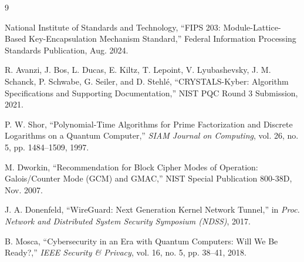 \documentclass[conference,onecolumn]{IEEEtran}
\begin{document}
\begin{thebibliography}{9}

National Institute of Standards and Technology, ``FIPS 203: Module-Lattice-Based Key-Encapsulation Mechanism Standard,'' Federal Information Processing Standards Publication, Aug. 2024.

R. Avanzi, J. Bos, L. Ducas, E. Kiltz, T. Lepoint, V. Lyubashevsky, J. M. Schanck, P. Schwabe, G. Seiler, and D. Stehlé, ``CRYSTALS-Kyber: Algorithm Specifications and Supporting Documentation,'' NIST PQC Round 3 Submission, 2021.

P. W. Shor, ``Polynomial-Time Algorithms for Prime Factorization and Discrete Logarithms on a Quantum Computer,'' \textit{SIAM Journal on Computing}, vol. 26, no. 5, pp. 1484–1509, 1997.

M. Dworkin, ``Recommendation for Block Cipher Modes of Operation: Galois/Counter Mode (GCM) and GMAC,'' NIST Special Publication 800-38D, Nov. 2007.

J. A. Donenfeld, ``WireGuard: Next Generation Kernel Network Tunnel,'' in \textit{Proc. Network and Distributed System Security Symposium (NDSS)}, 2017.

B. Mosca, ``Cybersecurity in an Era with Quantum Computers: Will We Be Ready?,'' \textit{IEEE Security \& Privacy}, vol. 16, no. 5, pp. 38--41, 2018.

\end{thebibliography}
\end{document}
